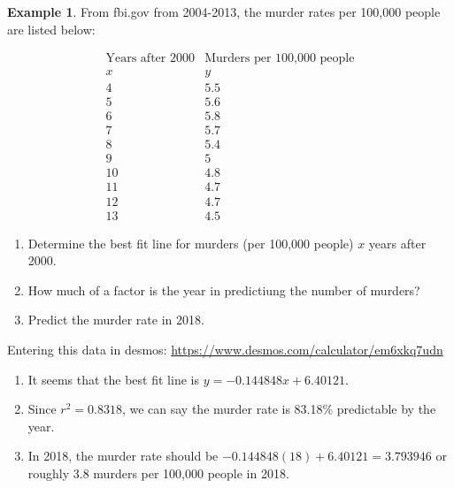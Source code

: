 \documentclass[10pt]{article}
\theoremstyle{definition}
\newtheorem{example}[equation]{Example}
\begin{document}
\begin{example}
From fbi.gov from 2004-2013, the murder rates per 100,000 people are listed below:

$$\begin{array}{c|c}
\text{Years after 2000} & \text{Murders per 100,000 people}\\
x&y\\
\hline
4&5.5\\
5&5.6\\
6&5.8\\
7&5.7\\
8&5.4\\
9&5\\
10&4.8\\
11&4.7\\
12&4.7\\
13&4.5
\end{array}$$
\begin{enumerate}
\item Determine the best fit line for murders (per 100,000 people) $x$ years after 2000.
\item How much of a factor is the year in predictiung the number of murders?
\item Predict the murder rate in 2018.
\end{enumerate}

Entering this data in desmos: \url{https://www.desmos.com/calculator/em6xkq7udn}

\begin{enumerate}
\item It seems that the best fit line is $y=-0.144848x+6.40121$.
\item Since $r^2=0.8318$, we can say the murder rate is 83.18\% predictable by the year.
\item In 2018, the murder rate should be $-0.144848(18)+6.40121=3.793946$ or roughly 3.8 murders per 100,000 people in 2018.
\end{enumerate}




\end{example}
\end{document}
